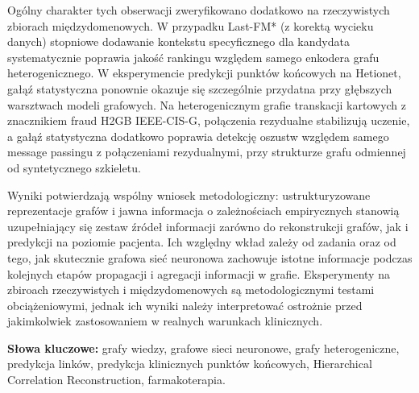 Ogólny charakter tych obserwacji zweryfikowano dodatkowo na rzeczywistych zbiorach międzydomenowych.
W przypadku Last-FM* (z korektą wycieku danych) stopniowe dodawanie kontekstu 
specyficznego dla kandydata systematycznie poprawia jakość rankingu względem samego enkodera grafu 
heterogenicznego.
W eksperymencie predykcji punktów końcowych na Hetionet, gałąź statystyczna 
ponownie okazuje się szczególnie przydatna przy głębszych warsztwach modeli grafowych.
Na heterogenicznym grafie transkacji kartowych z znacznikiem fraud
 H2GB IEEE-CIS-G, połączenia rezydualne stabilizują uczenie, a gałąź statystyczna dodatkowo 
 poprawia detekcję oszustw względem samego message passingu z połączeniami rezydualnymi, 
 przy strukturze grafu odmiennej od syntetycznego szkieletu.

Wyniki potwierdzają wspólny wniosek metodologiczny: 
ustrukturyzowane reprezentacje grafów i jawna informacja o zależnościach 
empirycznych stanowią uzupełniający się zestaw źródeł informacji zarówno do rekonstrukcji grafów, 
jak i predykcji na poziomie pacjenta.
Ich względny wkład zależy od zadania oraz od tego, jak skutecznie grafowa sieć neuronowa zachowuje 
istotne informacje podczas kolejnych etapów propagacji i agregacji informacji w grafie.
Eksperymenty na zbiroach rzeczywistych i międzydomenowych są metodologicznymi testami obciążeniowymi, 
jednak ich wyniki należy interpretować ostrożnie przed jakimkolwiek zastosowaniem w realnych 
warunkach klinicznych.

\medskip
\noindent\textbf{Słowa kluczowe:}
grafy wiedzy,
grafowe sieci neuronowe,
grafy heterogeniczne,
predykcja linków,
predykcja klinicznych punktów końcowych,
Hierarchical Correlation Reconstruction,
farmakoterapia.
